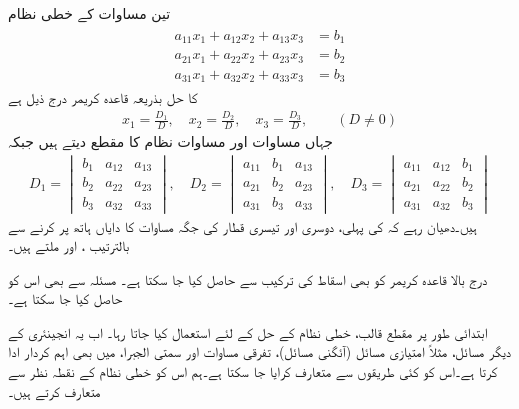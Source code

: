 تین مساوات کے خطی نظام
\begin{gather}
\begin{aligned}\label{مساوات_الجبرا_تین_درجی_خطی_کریمر}
a_{11}x_1+a_{12}x_2+a_{13}x_3&=b_1\\
a_{21}x_1+a_{22}x_2+a_{23}x_3&=b_2\\
a_{31}x_1+a_{32}x_2+a_{33}x_3&=b_3
\end{aligned}
\end{gather}
کا حل بذریعہ قاعدہ کریمر درج ذیل ہے
 \begin{align}
x_1=\frac{D_1}{D},\quad x_2=\frac{D_2}{D},\quad x_3=\frac{D_3}{D},\quad \quad (D\ne 0)
\end{align}
جہاں مساوات  اور مساوات  نظام کا مقطع   دیتے ہیں جبکہ 
\begin{align*}
D_1=
\begin{vmatrix}
b_1&a_{12}&a_{13}\\
b_2&a_{22}&a_{23}\\
b_3&a_{32}&a_{33}
\end{vmatrix},\quad
D_2=
\begin{vmatrix}
a_{11}&b_1&a_{13}\\
a_{21}&b_2&a_{23}\\
a_{31}&b_3&a_{33}
\end{vmatrix},\quad
D_3=
\begin{vmatrix}
a_{11}&a_{12}&b_1\\
a_{21}&a_{22}&b_2\\
a_{31}&a_{32}&b_3
\end{vmatrix}
\end{align*}
ہیں۔دھیان رہے کہ  کی پہلی، دوسری اور تیسری قطار کی جگہ مساوات  کا دایاں ہاتھ پر کرنے سے بالترتیب ،  اور  ملتے ہیں۔

درج بالا قاعدہ کریمر کو بھی اسقاط کی ترکیب سے حاصل کیا جا سکتا ہے۔  مسئلہ  سے بھی اس کو حاصل کیا جا سکتا ہے۔
 
ابتدائی طور پر مقطع قالب، خطی نظام کے حل کے لئے استعمال کیا جاتا رہا۔ اب یہ انجینئری کے دیگر مسائل، مثلاً امتیازی مسائل (آئگنی مسائل)، تفرقی مساوات اور سمتی الجبرا، میں بھی اہم کردار ادا کرتا ہے۔اس کو کئی طریقوں سے متعارف کرایا جا سکتا ہے۔ہم اس کو خطی نظام کے نقطہ نظر سے  متعارف کرتے ہیں۔

